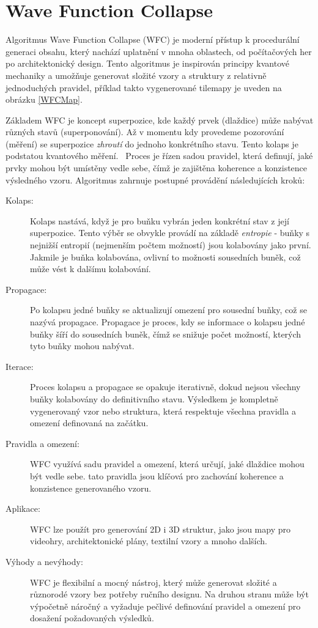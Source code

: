 \section{Wave Function Collapse}
Algoritmus Wave Function Collapse (WFC) je moderní přístup k procedurální generaci obsahu, který nachází uplatnění v mnoha oblastech, od počítačových her po architektonický design. Tento algoritmus je inspirován principy kvantové mechaniky a umožňuje generovat složité vzory a struktury z relativně jednoduchých pravidel, příklad takto vygenerované tilemapy je uveden na obrázku \ref{WFCMap}. \cite{cheng2020automatic}

Základem WFC je koncept superpozice, kde každý prvek (dlaždice) může nabývat různých stavů (superponování). Až v momentu kdy provedeme pozorování (měření) se superpozice \emph{zhroutí} do jednoho konkrétního stavu. Tento kolaps je podstatou kvantového měření.~\cite{Hwanhee2019} Proces je řízen sadou pravidel, která definují, jaké prvky mohou být umístěny vedle sebe, čímž je zajištěna koherence a konzistence výsledného vzoru. Algoritmus zahrnuje postupné provádění následujících kroků:

\begin{description}
	\item [Kolaps:] Kolaps nastává, když je pro buňku vybrán jeden konkrétní stav z její superpozice. Tento výběr se obvykle provádí na základě \emph{entropie} - buňky s nejnižší entropií (nejmenším počtem možností) jsou kolabovány jako první. Jakmile je buňka kolabována, ovlivní to možnosti sousedních buněk, což může vést k dalšímu kolabování.
	\item [Propagace:] Po kolapsu jedné buňky se aktualizují omezení pro sousední buňky, což se nazývá propagace. Propagace je proces, kdy se informace o kolapsu jedné buňky šíří do sousedních buněk, čímž se snižuje počet možností, kterých tyto buňky mohou nabývat.
	\item [Iterace:] Proces kolapsu a propagace se opakuje iterativně, dokud nejsou všechny buňky kolabovány do definitivního stavu. Výsledkem je kompletně vygenerovaný vzor nebo struktura, která respektuje všechna pravidla a omezení definovaná na začátku.
	\item [Pravidla a omezení:] WFC využívá sadu pravidel a omezení, která určují, jaké dlaždice mohou být vedle sebe. tato pravidla jsou klíčová pro zachování koherence a konzistence generovaného vzoru.
	\item [Aplikace:] WFC lze použít pro generování 2D i 3D struktur, jako jsou mapy pro videohry, architektonické plány, textilní vzory a mnoho dalších.
	\item [Výhody a nevýhody:] WFC je flexibilní a mocný nástroj, který může generovat složité a různorodé vzory bez potřeby ručního designu. Na druhou stranu může být výpočetně náročný a vyžaduje pečlivé definování pravidel a omezení pro dosažení požadovaných výsledků.
\end{description}

